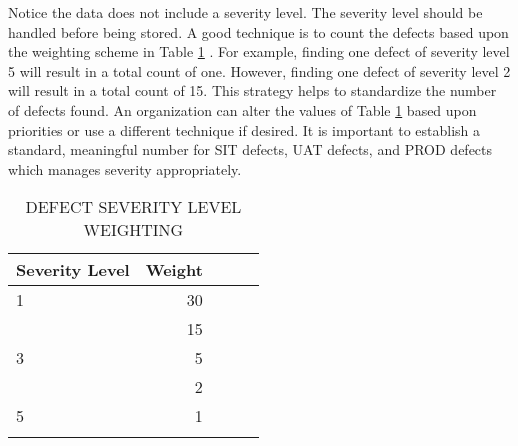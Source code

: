 \documentclass[SDSUThesis.tex]{subfiles}
\begin{document}
                Notice the data does not include a severity level.  The severity
                level should be handled before being stored.  A good technique is
                to count the defects based upon the weighting scheme
                in Table \ref{tab:severityweight} \cite{Raynus1999}. For
                example, finding one defect of severity level 5 will result
                in a total count of one.  However, finding one defect of severity
                level 2 will result in a total count of 15. This strategy helps
                to standardize the number of defects found.  An organization
                can alter the values of Table \ref{tab:severityweight} based 
                upon priorities or use a different technique if desired.  It
                is important to establish a standard, meaningful number for SIT defects,
                UAT defects, and PROD defects which manages severity appropriately.
                
                \begin{longtable}{@{}l rr rr}
                    
                    \toprule%
                     \centering%
                     {\bfseries Severity Level}
                     & {\bfseries Weight} \\
                    
                    \cmidrule[0.4pt](r{0.125em}){1-1}%
                    \cmidrule[0.4pt](lr{0.125em}){2-2}%
                    \endhead
                    
                    1 & 30 \\
                    \myrowcolour%
                    2 &  15 \\
                    3 &  5 \\
                    \myrowcolour%
                    4 &  2 \\ 
                    5 &  1 \\ 
                    
                    \bottomrule
                    
                    \caption{DEFECT SEVERITY LEVEL WEIGHTING}
                    \label{tab:severityweight}
                \end{longtable}
            
\end{document}
